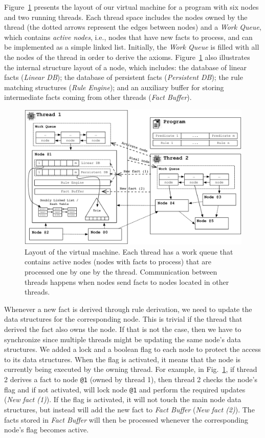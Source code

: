 Figure~\ref{fig:implementation:vm_overview} presents the layout of our virtual
machine for a program with six nodes and two running threads. Each thread space
includes the nodes owned by the thread (the dotted arrows represent the edges
between nodes) and a \emph{Work Queue}, which contains \emph{active nodes},
i.e., nodes that have new facts to process, and can be implemented as a simple
linked list. Initially, the \emph{Work Queue} is filled with all the nodes of
the thread in order to derive the axioms.
Figure~\ref{fig:implementation:vm_overview} also illustrates the internal
structure layout of a node, which includes: the database of linear facts
(\emph{Linear DB}); the database of persistent facts (\emph{Persistent DB}); the
rule matching structures (\emph{Rule Engine}); and an auxiliary buffer for
storing intermediate facts coming from other threads (\emph{Fact Buffer}).

\begin{figure}[t]
\centering
\includegraphics[width=\textwidth]{figures/implementation/vm_overview.pdf}
\caption{Layout of the virtual machine. Each thread has a work queue that
   contains active nodes (nodes with facts to process) that are processed one
   by one by the thread. Communication between threads happens when nodes
   send facts to nodes located in other threads.}
\label{fig:implementation:vm_overview}
\end{figure}

Whenever a new fact is derived through rule derivation, we need to update the
data structures for the corresponding node. This is trivial if the thread that
derived the fact also owns the node. If that is not the case, then we have to
synchronize since multiple threads might be updating the same node's data
structures. We added a lock and a boolean flag to each node to protect the
access to its data structures. When the flag is activated, it means that the
node is currently being executed by the owning thread. For example, in
Fig.~\ref{fig:implementation:vm_overview}, if thread 2 derives a fact to node
\texttt{@1} (owned by thread 1), then thread 2 checks the node's flag and if not
activated, will lock node \texttt{@1} and perform the required updates
(\emph{New fact (1)}). If the flag is activated, it will not touch the main node
data structures, but instead will add the new fact to \emph{Fact Buffer}
(\emph{New fact (2)}). The facts stored in \emph{Fact Buffer} will then be
processed whenever the corresponding node's flag becomes active.

